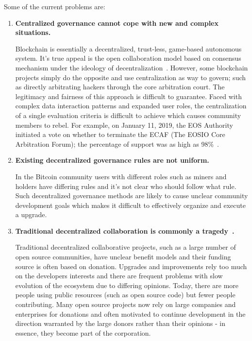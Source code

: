 Some of the current problems are:

\begin{enumerate}
	\item 

	\textbf{Centralized governance cannot cope with new and complex situations.}

	Blockchain is essentially a decentralized, trust-less, game-based autonomous system. It's true appeal is the open collaboration model based on consensus mechanism under the ideology of decentralization~\cite{whitepaper}. However, some blockchain projects simply do the opposite and use centralization as way to govern; such as directly arbitrating hackers through the core arbitration court. The legitimacy and fairness of this approach is difficult to guarantee. Faced with complex data interaction patterns and expanded user roles, the centralization of a single evaluation criteria is difficult to achieve which causes community members to rebel. For example, on January 11, 2019, the EOS Authority initiated a vote on whether to terminate the ECAF (The EOSIO Core Arbitration Forum); the percentage of support was as high as 98\%~\cite{DeleteECAF}.

	\item 

	\textbf{Existing decentralized governance rules are not uniform.}

	In the Bitcoin community users with different roles such as miners and holders have differing rules and it's not clear who should follow what rule. Such decentralized governance methods are likely to cause unclear community development goals which makes it difficult to effectively organize and execute a upgrade.

	\item 

	\textbf{Traditional decentralized collaboration is commonly a tragedy~\cite{TragedyOfTheCommons}.}

	Traditional decentralized collaborative projects, such as a large number of open source communities, have unclear benefit models and their funding source is often based on donation. Upgrades and improvements rely too much on the developers interests and there are frequent problems with slow evolution of the ecosystem due to differing opinions. Today, there are more people using public resources (such as open source code) but fewer people contributing. Many open source projects now rely on large companies and enterprises for donations and often motivated to continue development in the direction warranted by the large donors rather than their opinions - in essence, they become part of the corporation.


\end{enumerate}
